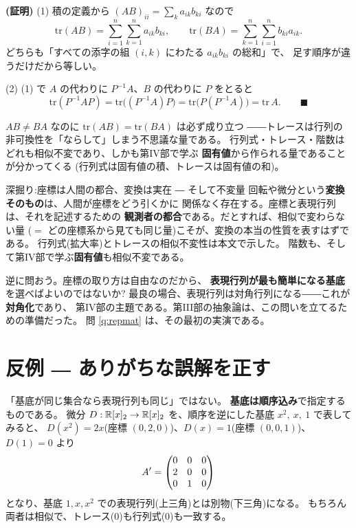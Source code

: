 \noindent\textbf{(証明)}\quad
(1) 積の定義から $(AB)_{ii} = \sum_k a_{ik}b_{ki}$ なので
\[
\mathrm{tr}(AB) = \sum_{i=1}^n \sum_{k=1}^n a_{ik}b_{ki}, \qquad
\mathrm{tr}(BA) = \sum_{k=1}^n \sum_{i=1}^n b_{ki}a_{ik}.
\]
どちらも「すべての添字の組 $(i, k)$ にわたる $a_{ik}b_{ki}$ の総和」で、
足す順序が違うだけだから等しい。

(2) (1) で $A$ の代わりに $P^{-1}A$、$B$ の代わりに $P$ をとると
\[
\mathrm{tr}(P^{-1}AP) = \mathrm{tr}\bigl((P^{-1}A)P\bigr)
= \mathrm{tr}\bigl(P(P^{-1}A)\bigr) = \mathrm{tr}\,A. \qquad\blacksquare
\]

$AB \neq BA$ なのに $\mathrm{tr}(AB) = \mathrm{tr}(BA)$ は必ず成り立つ
――トレースは行列の非可換性を「ならして」しまう不思議な量である。
行列式・トレース・階数はどれも相似不変であり、しかも第IV部で学ぶ
\textbf{固有値}から作られる量であることが分かってくる
(行列式は固有値の積、トレースは固有値の和)。

\begin{itembox}[l]{深掘り:座標は人間の都合、変換は実在 ― そして不変量}
回転や微分という\textbf{変換そのもの}は、人間が座標をどう引くかに
関係なく存在する。座標と表現行列は、それを記述するための
\textbf{観測者の都合}である。だとすれば、相似で変わらない量
($= $ どの座標系から見ても同じ量)こそが、変換の本当の性質を表すはずである。
行列式(拡大率)とトレースの相似不変性は本文で示した。
階数も、そして第IV部で学ぶ\textbf{固有値}も相似不変である。

逆に問おう。座標の取り方は自由なのだから、
\textbf{表現行列が最も簡単になる基底}を選べばよいのではないか?
最良の場合、表現行列は対角行列になる――これが\textbf{対角化}であり、
第IV部の主題である。第III部の抽象論は、この問いを立てるための準備だった。
問 \ref{q:repmat} は、その最初の実演である。
\end{itembox}

\section{反例 ― ありがちな誤解を正す}

\begin{hanrei}[表現行列は基底の順序にも依存する]\label{hanrei:repmat-order}
「基底が同じ集合なら表現行列も同じ」ではない。
\textbf{基底は順序込み}で指定するものである。
微分 $D : \mathbb{R}[x]_2 \to \mathbb{R}[x]_2$ を、順序を逆にした基底
$x^2,\ x,\ 1$ で表してみると、
$D(x^2) = 2x$(座標 $(0, 2, 0)$)、$D(x) = 1$(座標 $(0, 0, 1)$)、
$D(1) = 0$ より
\[
A' = \begin{pmatrix}0 & 0 & 0 \\ 2 & 0 & 0 \\ 0 & 1 & 0\end{pmatrix}
\]
となり、基底 $1, x, x^2$ での表現行列(上三角)とは別物(下三角)になる。
もちろん両者は相似で、トレース($0$)も行列式($0$)も一致する。
\end{hanrei}

